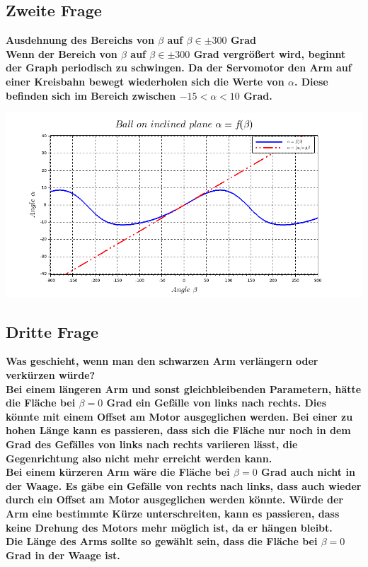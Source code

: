 \subsection{Zweite Frage}
\bfseries Ausdehnung des Bereichs von $\beta$ auf $\beta \in \pm 300$ Grad \\
\mdseries Wenn der Bereich von $\beta$ auf $\beta \in \pm300$ Grad vergrößert wird, beginnt der Graph periodisch zu schwingen. Da der Servomotor den Arm auf einer Kreisbahn bewegt wiederholen sich die Werte von $\alpha$. Diese befinden sich im Bereich zwischen $-15<\alpha<10$ Grad.\\
\begin{center}
	\begin{minipage}{\linewidth}
	\centering
	\includegraphics[scale=0.45]{images/plot2_1.png}
	\end{minipage}
\end{center}

\subsection{Dritte Frage}
\bfseries Was geschieht, wenn man den schwarzen Arm verlängern oder verkürzen würde? \\
\mdseries Bei einem längeren Arm und sonst gleichbleibenden Parametern, hätte die Fläche bei $\beta = 0$ Grad ein Gefälle von links nach rechts. Dies könnte mit einem Offset am Motor ausgeglichen werden. Bei einer zu hohen Länge kann es passieren, dass sich die Fläche nur noch in dem Grad des Gefälles von links nach rechts variieren lässt, die Gegenrichtung also nicht mehr erreicht werden kann. \\
Bei einem kürzeren Arm wäre die Fläche bei $\beta = 0$ Grad auch nicht in der Waage. Es gäbe ein Gefälle von rechts nach links, dass auch wieder durch ein Offset am Motor ausgeglichen werden könnte. Würde der Arm eine bestimmte Kürze unterschreiten, kann es passieren, dass keine Drehung des Motors mehr möglich ist, da er hängen bleibt. \\
Die Länge des Arms sollte so gewählt sein, dass die Fläche bei $\beta = 0$ Grad in der Waage ist.